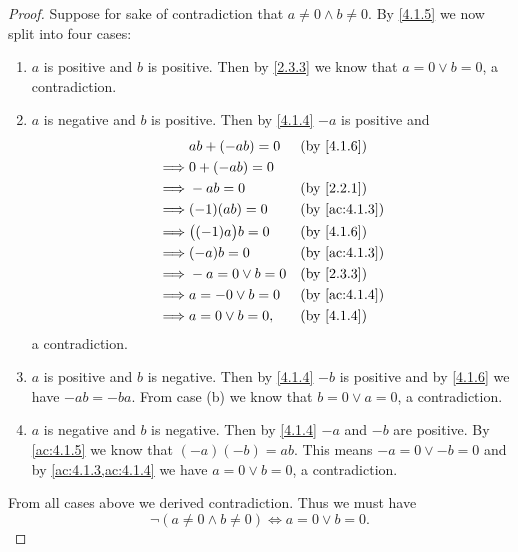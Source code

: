 \begin{proof}
  Suppose for sake of contradiction that \(a \neq 0 \land b \neq 0\).
  By \cref{4.1.5} we now split into four cases:
  \begin{enumerate}
    \item \(a\) is positive and \(b\) is positive.
          Then by \cref{2.3.3} we know that \(a = 0 \lor b = 0\), a contradiction.
    \item \(a\) is negative and \(b\) is positive.
          Then by \cref{4.1.4} \(-a\) is positive and
          \begin{align*}
                     & ab + (-ab) = 0       &  & \by{4.1.6}                  \\
            \implies & 0 + (-ab) = 0                                         \\
            \implies & -ab = 0              &  & \by{2.2.1}                  \\
            \implies & (-1)(ab) = 0         &  & \text{(by \cref{ac:4.1.3})} \\
            \implies & \big((-1)a\big)b = 0 &  & \by{4.1.6}                  \\
            \implies & (-a)b = 0            &  & \text{(by \cref{ac:4.1.3})} \\
            \implies & -a = 0 \lor b = 0    &  & \by{2.3.3}                  \\
            \implies & a = -0 \lor b = 0    &  & \text{(by \cref{ac:4.1.4})} \\
            \implies & a = 0 \lor b = 0,    &  & \by{4.1.4}
          \end{align*}
          a contradiction.
    \item \(a\) is positive and \(b\) is negative.
          Then by \cref{4.1.4} \(-b\) is positive and by \cref{4.1.6} we have \(-ab = -ba\).
          From case (b) we know that \(b = 0 \lor a = 0\), a contradiction.
    \item \(a\) is negative and \(b\) is negative.
          Then by \cref{4.1.4} \(-a\) and \(-b\) are positive.
          By \cref{ac:4.1.5} we know that \((-a)(-b) = ab\).
          This means \(-a = 0 \lor -b = 0\) and by \cref{ac:4.1.3,ac:4.1.4} we have \(a = 0 \lor b = 0\), a contradiction.
  \end{enumerate}
  From all cases above we derived contradiction.
  Thus we must have
  \[
    \lnot(a \neq 0 \land b \neq 0) \iff a = 0 \lor b = 0.
  \]
\end{proof}

